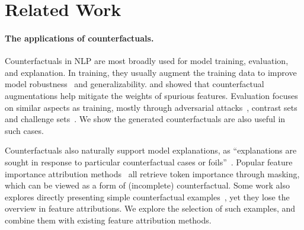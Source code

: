 \section{Related Work}
\label{sec:relate}

\paragraph{The applications of counterfactuals.}
Counterfactuals in NLP are most broadly used for model training, evaluation, and explanation.
In training, they usually augment the training data to improve model robustness~\cite{garg2019counterfactual, Wu2019ConditionalBC, Wei2019EDAED, Kumar2020DataAU} and generalizability.
\citet{kaushik2019learning} and \citet{teney2020learning} showed that counterfactual augmentations help mitigate the weights of spurious features.
Evaluation focuses on similar aspects as training, mostly through adversarial attacks~\cite{Song2020UniversalAA}, contrast sets~\cite{kaushik2019learning} and challenge sets~\cite{Geiger2019PosingFG, liu-etal-2019-inoculation}.
We show the \sysname generated counterfactuals are also useful in such cases.

Counterfactuals also naturally support model explanations, as ``explanations are sought in response to particular counterfactual cases or foils''~\cite{miller}.
Popular feature importance attribution methods~\cite{NIPS2017_7062, Ribeiro2016WhySI} all retrieve token importance through masking, which can be viewed as a form of (incomplete) counterfactual.
Some work also explores directly presenting simple counterfactual examples~\cite{ross2020explaining, vig2020causal, kang2020counterfactual}, yet they lose the overview in feature attributions.
We explore the selection of such examples, and combine them with existing feature attribution methods.


